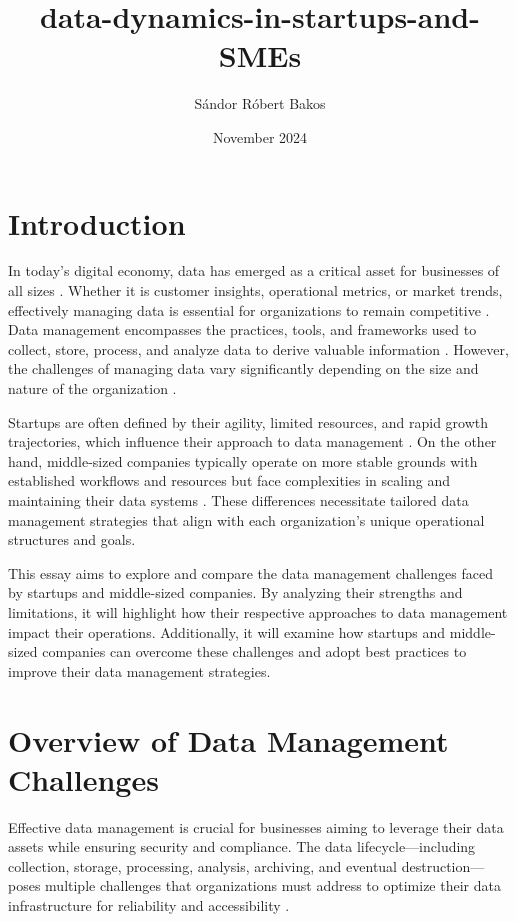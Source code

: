 \documentclass{article}
\title{data-dynamics-in-startups-and-SMEs}
\author{Sándor Róbert Bakos}
\date{November 2024}
\begin{document}
\maketitle

\section*{Introduction} \cite{openai2024chatgpt}

In today’s digital economy, data has emerged as a critical asset for businesses of all sizes \cite{mcafee2012bigdata}. Whether it is customer insights, operational metrics, or market trends, effectively managing data is essential for organizations to remain competitive \cite{redman2013credibility}. Data management encompasses the practices, tools, and frameworks used to collect, store, process, and analyze data to derive valuable information \cite{dama2017dmbook}. However, the challenges of managing data vary significantly depending on the size and nature of the organization \cite{davenport2014bigdata}.

Startups are often defined by their agility, limited resources, and rapid growth trajectories, which influence their approach to data management \cite{ries2011leanstartup}. On the other hand, middle-sized companies typically operate on more stable grounds with established workflows and resources but face complexities in scaling and maintaining their data systems \cite{european2015smedef}. These differences necessitate tailored data management strategies that align with each organization's unique operational structures and goals.

This essay aims to explore and compare the data management challenges faced by startups and middle-sized companies. By analyzing their strengths and limitations, it will highlight how their respective approaches to data management impact their operations. Additionally, it will examine how startups and middle-sized companies can overcome these challenges and adopt best practices to improve their data management strategies.

\section*{Overview of Data Management Challenges} \cite{openai2024chatgpt}

Effective data management is crucial for businesses aiming to leverage their data assets while ensuring security and compliance. The data lifecycle—including collection, storage, processing, analysis, archiving, and eventual destruction—poses multiple challenges that organizations must address to optimize their data infrastructure for reliability and accessibility \cite{dama2017}.
\end{document}
